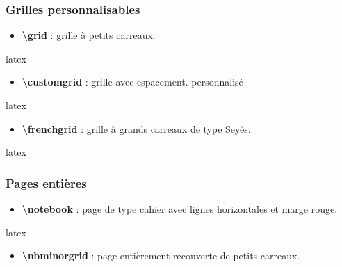 \documentclass[
    french,
    margin=2cm
]{neoschool}
\begin{document}
\subsubsection{Grilles personnalisables}

\begin{itemize}
\item \textbf{\textbackslash grid} : grille à petits carreaux.
\end{itemize}

\begin{code}{latex}
\grid[blue]{10cm}{5cm}  %
\end{code}

\begin{itemize}
\item \textbf{\textbackslash customgrid} : grille avec espacement.
  personnalisé
\end{itemize}

\begin{code}{latex}
\customgrid[red][4mm][4mm]{12cm}{8cm}  %
\end{code}

\begin{itemize}
\item \textbf{\textbackslash frenchgrid} : grille à grands carreaux de type Seyès.
\end{itemize}

\begin{code}{latex}
\frenchgrid{15cm}{10cm}  %
\end{code}

\subsubsection{Pages entières}

\begin{itemize}
\item \textbf{\textbackslash notebook} : page de type cahier avec lignes horizontales et
  marge rouge.
\end{itemize}

\begin{code}{latex}
\notebook  %
\end{code}

\begin{itemize}
\item \textbf{\textbackslash nbminorgrid} : page entièrement recouverte de petits carreaux.
\end{itemize}
\end{document}
